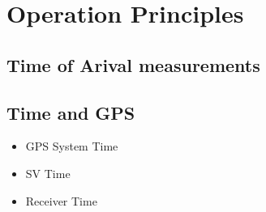 %
\section{Operation Principles}
%
\subsection{Time of Arival measurements}

%
%
%
%
%
\subsection{Time and GPS}
\begin{itemize}
\item GPS System Time
\item SV Time
\item Receiver Time
\end{itemize}
%
%
%
%


